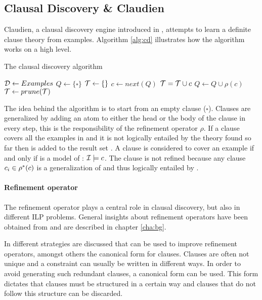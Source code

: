 \subsection{Clausal Discovery \& Claudien}
\label{sec:claudien}
Claudien, a clausal discovery engine introduced in \cite{DeRaedt:ClausalDiscovery}, attempts to learn a definite clause theory from examples.
Algorithm \ref{alg:cd} illustrates how the algorithm works on a high level. 

\begin{algorithm}
	\caption{The clausal discovery algorithm}
	\label{alg:cd}

	\begin{algorithmic}
	\State $\mathcal{D} \gets Examples$
	\State $Q \gets \{\square\}$
	\State $\mathcal{T} \gets \{\}$
		\State $c \gets next(Q)$
				\State $\mathcal{T} = \mathcal{T} \cup c$
			\EndIf
		\Else
			\State $Q \gets Q \cup \rho(c)$
		\EndIf
	\EndWhile
	\State $\mathcal{T} \gets prune(\mathcal{T})$
	\State \Return {}
	\end{algorithmic}
\end{algorithm}

The idea behind the algorithm is to start from an empty clause ($\square$).
Clauses are generalized by adding an atom to either the head or the body of the clause in every step, this is the responsibility of the refinement operator $\rho$.
If a clause  covers all the examples in  and it is not logically entailed by the theory found so far then  is added to the result set .
A clause  is considered to cover an example  if and only if  is a model of : $\mathcal{I} \models c$.
The clause  is not refined because any clause $c_i \in \rho^*(c)$ is a generalization of  and thus logically entailed by .

\paragraph{Refinement operator}
The refinement operator plays a central role in clausal discovery, but also in different ILP problems.
General insights about refinement operators have been obtained from \cite{DeRaedt:LRLearning} and are described in chapter \ref{cha:bg}.

In \cite{DeRaedt:CondensedRepresentations} different strategies are discussed that can be used to improve refinement operators, amongst others the canonical form for clauses.
Clauses are often not unique and a constraint can usually be written in different ways.
In order to avoid generating such redundant clauses, a canonical form can be used.
This form dictates that clauses must be structured in a certain way and clauses that do not follow this structure can be discarded.

